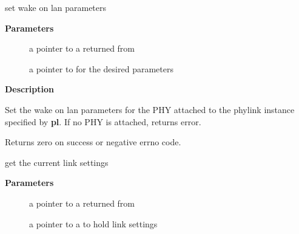 \documentclass[a4paper,8pt,english]{sphinxmanual}
\begin{document}
\begin{fulllineitems}
\label{networking/kapi:c.phylink_ethtool_set_wol}
set wake on lan parameters

\end{fulllineitems}


\textbf{Parameters}
\begin{description}
\item[{}] \leavevmode
a pointer to a {\hyperref[networking/kapi:c.phylink]{\emph{}}} returned from {\hyperref[networking/kapi:c.phylink_create]{\emph{}}}

\item[{}] \leavevmode
a pointer to  for the desired parameters

\end{description}

\textbf{Description}

Set the wake on lan parameters for the PHY attached to the phylink
instance specified by \textbf{pl}. If no PHY is attached, returns 
error.

Returns zero on success or negative errno code.

\begin{fulllineitems}
\label{networking/kapi:c.phylink_ethtool_ksettings_get}
get the current link settings

\end{fulllineitems}


\textbf{Parameters}
\begin{description}
\item[{}] \leavevmode
a pointer to a {\hyperref[networking/kapi:c.phylink]{\emph{}}} returned from {\hyperref[networking/kapi:c.phylink_create]{\emph{}}}

\item[{}] \leavevmode
a pointer to a  to hold link settings

\end{description}
\end{document}
